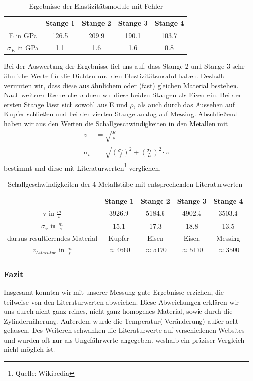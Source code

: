 \documentclass[12pt,a4paper]{article}
\begin{document}
\begin{table}[H]\centering
\caption{Ergebnisse der Elastizitätsmodule mit Fehler}
\begin{tabular}{c|cccc}
 & Stange 1 & Stange 2 & Stange 3 & Stange 4 \\
\hline 
E in GPa & 126.5 & 209.9 & 190.1 & 103.7 \\ 
$\sigma_E$ in GPa & 1.1 & 1.6 & 1.6 & 0.8 \\ 
\end{tabular} 
\end{table}

Bei der Auswertung der Ergebnisse fiel uns auf, dass Stange 2 und Stange 3 sehr ähnliche Werte für die Dichten und den Elastizitätsmodul haben. Deshalb vermuten wir, dass diese aus ähnlichem oder (fast) gleichen Material bestehen. Nach weiterer Recherche ordnen wir diese beiden Stangen als Eisen ein. Bei der ersten Stange lässt sich sowohl aus E und $\rho$, als auch durch das Aussehen auf Kupfer schließen und bei der vierten Stange analog auf Messing.\newline
Abschließend haben wir aus den Werten die Schallgeschwindigkeiten in den Metallen mit
\begin{align}
v&=\sqrt{\frac{E}{\rho}}\\
\sigma_v&=\sqrt{(\frac{\sigma_f}{f})^2+(\frac{\sigma_L}{L})^2}\cdot v
\end{align}
 bestimmt und diese mit Literaturwerten\footnote{Quelle: Wikipedia} verglichen.

\begin{table}[H]\centering
\caption{Schallgeschwindigkeiten der 4 Metallstäbe mit entsprechenden Literaturwerten}
\begin{tabular}{c|cccc}
 & Stange 1 & Stange 2 & Stange 3 & Stange 4 \\ 
\hline
v in $\frac{m}{s}$ & 3926.9 & 5184.6 & 4902.4 & 3503.4 \\ 
$\sigma_{v}$ in $\frac{m}{s}$ & 15.1 & 17.3 & 18.8 & 13.5 \\ 
daraus resultierendes Material & Kupfer & Eisen & Eisen & Messing \\ 
$v_{Literatur}$ in $\frac{m}{s}$ &$\approx 4660$ & $\approx 5170$ & $\approx 5170$ & $\approx 3500$ \\ 
\end{tabular} 
\end{table}

\subsubsection{Fazit}
Insgesamt konnten wir mit unserer Messung gute Ergebnisse erziehen, die teilweise von den Literaturwerten abweichen. Diese Abweichungen erklären wir uns durch nicht ganz reines, nicht ganz homogenes Material, sowie durch die Zylindernäherung. Außerdem wurde die Temperatur(-Veränderung) außer acht gelassen. Des Weiteren schwanken die Literaturwerte auf verschiedenen Websites und wurden oft nur als Ungefährwerte angegeben, weshalb ein präziser Vergleich nicht möglich ist.
\newpage
\end{document}
